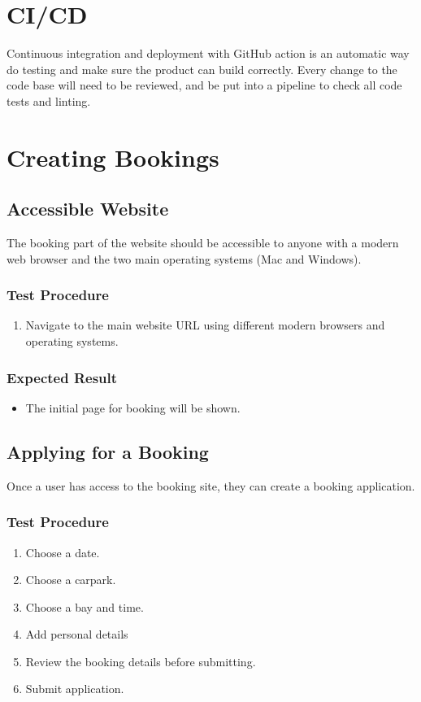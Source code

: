 \documentclass[a4paper, draft]{article}
\begin{document}
\section{CI/CD}
Continuous integration and deployment with GitHub action is an automatic way do testing and make sure the product can build correctly. Every change to the code base will need to be reviewed, and be put into a pipeline to check all code tests and linting. 

\newpage
\section{Creating Bookings}
\subsection{Accessible Website}
The booking part of the website should be accessible to anyone with a modern web browser and the two main operating systems (Mac and Windows).

\subsubsection{Test Procedure}
\begin{enumerate}
  \item Navigate to the main website URL using different modern browsers and operating systems.
\end{enumerate}

\subsubsection{Expected Result}
\begin{itemize}
  \item The initial page for booking will be shown.
\end{itemize}

\subsection{Applying for a Booking}
Once a user has access to the booking site, they can create a booking application.

\subsubsection{Test Procedure}
\begin{enumerate}
  \item Choose a date.
  \item Choose a carpark.
  \item Choose a bay and time.
  \item Add personal details
  \item Review the booking details before submitting.
  \item Submit application.
\end{enumerate}
\end{document}
